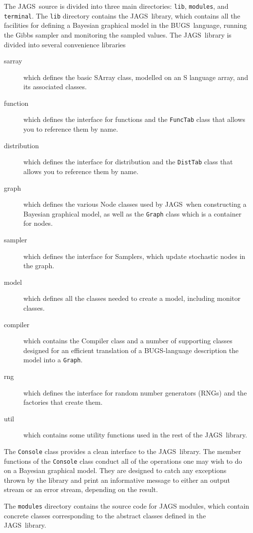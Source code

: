 \documentclass[11pt, a4paper, titlepage]{report}
\newcommand{\JAGS}{\textsf{JAGS}}
\newcommand{\BUGS}{\textsf{BUGS}}
\begin{document}
The \JAGS\ source is divided into three main directories:
\texttt{lib}, \texttt{modules}, and \texttt{terminal}. The
\texttt{lib} directory contains the \JAGS\ library, which contains all
the facilities for defining a Bayesian graphical model in the \BUGS\
language, running the Gibbs sampler and monitoring the sampled
values. The \JAGS\ library is divided into several convenience
libraries
\begin{description}
\item[sarray] which defines the basic SArray class, modelled on an
\textsf{S} language array, and its associated classes.
\item[function] which defines the interface for functions and
the \texttt{FuncTab} class that allows you to reference them by name.
\item[distribution] which defines the interface for distribution and
the \texttt{DistTab} class that allows you to reference them by name.
\item[graph] which defines the various Node classes used by \JAGS\
when constructing a Bayesian graphical model, as well as the \texttt{Graph}
class which is a container for nodes.
\item[sampler] which defines the interface for Samplers, which update
stochastic nodes in the graph.
\item[model] which defines all the classes needed to create a model,
including monitor classes.
\item[compiler] which contains the Compiler class and a number of 
supporting classes designed for an efficient translation of a BUGS-language
description the model into a \texttt{Graph}.
\item[rng] which defines the interface for random number generators (RNGs)
and the factories that create them.
\item[util] which contains some utility functions used in the rest of
the \JAGS\ library.
\end{description}
The \texttt{Console} class provides a clean interface to the \JAGS\
library.  The member functions of the \texttt{Console} class conduct
all of the operations one may wish to do on a Bayesian graphical
model.  They are designed to catch any exceptions thrown by the
library and print an informative message to either an output stream or
an error stream, depending on the result.

The \texttt{modules} directory contains the source code for JAGS
modules, which contain concrete classes corresponding to the abstract
classes defined in the \JAGS\ library.
\end{document}
